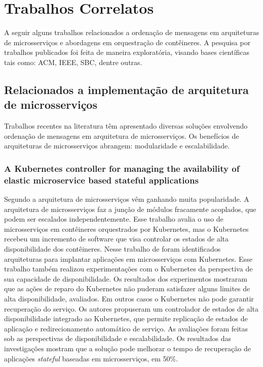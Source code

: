 \chapter{Trabalhos Correlatos}
\label{cap:correlatos}

A seguir alguns trabalhos relacionados a ordenação de mensagens em arquiteturas de microsserviços e abordagens em orquestração de contêineres. A pesquisa por trabalhos publicados foi feita de maneira exploratória, visando bases científicas tais como: \gls{ACM}, \gls{IEEE}, \gls{SBC}, dentre outras.

\section{Relacionados a implementação de arquitetura de microsserviços}

Trabalhos recentes na literatura têm apresentado diversas soluções envolvendo ordenação de mensagens em arquitetura de microsserviços. Os benefícios de arquiteturas de microsserviços abrangem: modularidade e escalabilidade.


\subsection{A Kubernetes controller for managing the availability of elastic microservice based stateful applications}

Segundo \textcite{vayghan2021kubernetes} a arquitetura de microsserviços vêm ganhando muita popularidade. A arquitetura de microsserviços faz a junção de módulos fracamente acoplados, que podem ser escalados independentemente. Esse trabalho avalia o uso de microsserviços em contêineres orquestrados por Kubernetes, mas o Kubernetes recebeu um incremento de software que visa controlar os estados de alta disponibilidade dos contêineres. Nesse trabalho de \textcite{vayghan2021kubernetes} foram identificados arquiteturas para implantar aplicações em microsserviços com Kubernetes. Esse trabalho também realizou experimentações com o Kubernetes da perspectiva de sua capacidade de disponibilidade. Os resultados dos experimentos mostraram que as ações de reparo do Kubernetes não puderam satisfazer alguns limites de alta disponibilidade, avaliados. Em outros casos o Kubernetes não pode garantir recuperação do serviço. Os autores propuseram um controlador de estados de alta disponibilidade integrado ao Kubernetes, que permite replicação de estados de aplicação e redirecionamento automático de serviço. As avaliações foram feitas sob as perspectivas de disponibilidade e escalabilidade. Os resultados das investigações mostram que a solução pode melhorar o tempo de recuperação de aplicações \textit{stateful} baseadas em microsserviços, em 50\%.

